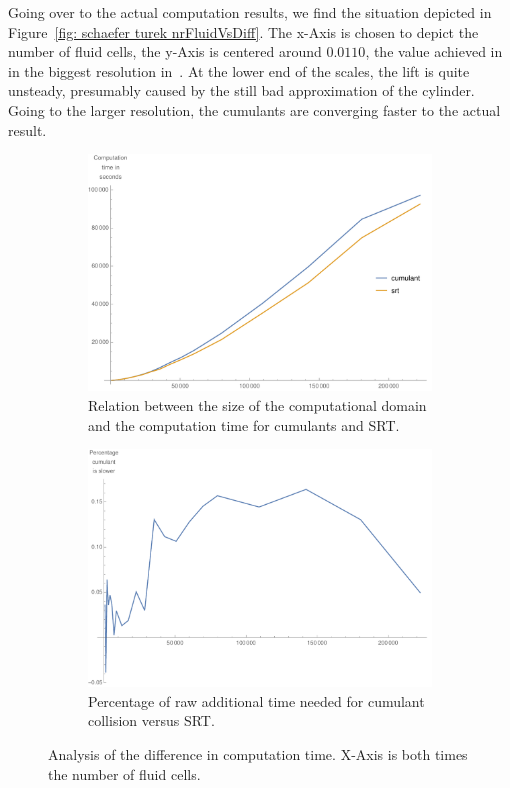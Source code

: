 Going over to the actual computation results, we find the situation depicted in Figure~\ref{fig: schaefer turek nrFluidVsDiff}.
The x-Axis is chosen to depict the number of fluid cells, the y-Axis is centered around $0.0110$, the value  achieved in in the biggest resolution in~\cite{schafer1996benchmark}.
At the lower end of the scales, the lift is quite unsteady, presumably caused by the still bad approximation of the cylinder.
Going to the larger resolution, the cumulants are converging faster to the actual result.

\begin{figure}
\centering
\begin{subfigure}{.48\textwidth}
  \centering
  \includegraphics[width=\linewidth]{../figures/schaeferTurekLift_domainVsTime.pdf} %
  \caption{Relation between the size of the computational domain and the computation time for cumulants and SRT.}
\label{fig: schaefer turek domain vs time}
\end{subfigure}\hfill
\begin{subfigure}{.48\textwidth}
  \centering
  \includegraphics[width=\linewidth]{../figures/schaeferTurekLift_performanceGap.pdf} %
  \caption{Percentage of raw additional time needed for cumulant collision versus SRT.}
\label{fig: schaefer turek time percentage}
\end{subfigure}
\caption{Analysis of the difference in computation time. X-Axis is both times the number of fluid cells.}
\label{fig: time analysis cumulant vs SRT}
\end{figure}

